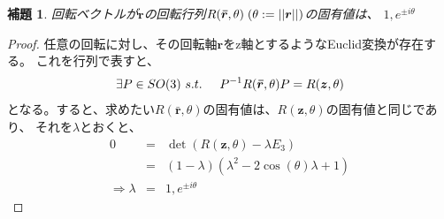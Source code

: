 \documentclass[10pt]{jarticle}
\newtheorem{Lem}{補題}[section]
\begin{document}
\begin{Lem} \label{lem:eigR}
    回転ベクトルが$\boldsymbol{r}$の回転行列$R(\boldsymbol{\bar{r}},\theta) \hspace{1mm} (\theta:=||\boldsymbol{r}||)$の固有値は、
    $1,e^{\pm i\theta}$
\end{Lem}
\begin{proof}
    任意の回転に対し、その回転軸$\boldsymbol{r}$をz軸とするようなEuclid変換が存在する。
    これを行列で表すと、
    \begin{eqnarray}
        \exists P \in SO(3) \ s.t.\hspace{5mm} 
        P^{-1} R(\boldsymbol{\bar{r}},\theta) P = R(\boldsymbol{z},\theta)
    \end{eqnarray}
    となる。すると、求めたい$R(\boldsymbol{\bar{r}},\theta)$の固有値は、$R(\boldsymbol{z},\theta)$の固有値と同じであり、
    それを$\lambda$とおくと、
    \begin{eqnarray}
        0&=&\det(R(\boldsymbol{z},\theta)-\lambda E_3) \nonumber\\
        &=& (1-\lambda)(\lambda^2-2\cos(\theta)\lambda+1) \nonumber\\
        \Rightarrow \lambda&=&1,e^{\pm i\theta}
    \end{eqnarray}
    
\end{proof}
\end{document}
